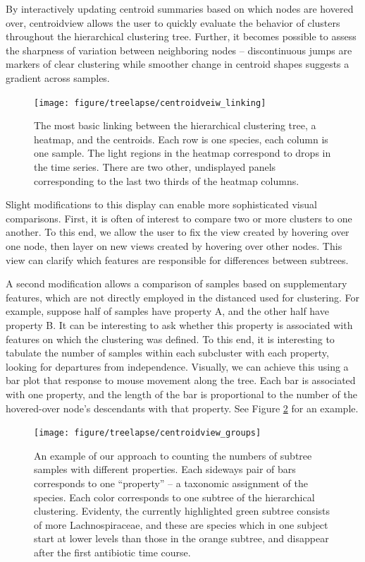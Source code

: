 By interactively updating centroid summaries based on which nodes are hovered
over, centroidview allows the user to quickly evaluate the behavior of clusters
throughout the hierarchical clustering tree. Further, it becomes possible to
assess the sharpness of variation between neighboring nodes -- discontinuous
jumps are markers of clear clustering while smoother change in centroid shapes
suggests a gradient across samples.

\begin{figure}
  \centering
  \texttt{[image: figure/treelapse/centroidveiw\_linking]}
  \caption{
    The most basic linking between the hierarchical clustering tree, a heatmap,
    and the centroids. Each row is one species, each column is one sample. The
    light regions in the heatmap correspond to drops in the time series. There
    are two other, undisplayed panels corresponding to the last two thirds of
    the heatmap columns.
    \label{fig:centroidview_linking}
  }
\end{figure}

Slight modifications to this display can enable more sophisticated visual
comparisons. First, it is often of interest to compare two or more clusters to
one another. To this end, we allow the user to fix the view created by hovering
over one node, then layer on new views created by hovering over other nodes.
This view can clarify which features are responsible for differences between
subtrees.

A second modification allows a comparison of samples based on supplementary
features, which are not directly employed in the distanced used for clustering.
For example, suppose half of samples have property A, and the other half have
property B. It can be interesting to ask whether this property is associated
with features on which the clustering was defined. To this end, it is
interesting to tabulate the number of samples within each subcluster with each
property, looking for departures from independence. Visually, we can achieve
this using a bar plot that response to mouse movement along the tree. Each bar
is associated with one property, and the length of the bar is proportional to
the number of the hovered-over node's descendants with that property. See Figure
\ref{fig:centroidview_groups} for an example.

\begin{figure}
  \centering
  \texttt{[image: figure/treelapse/centroidview\_groups]}
  \caption{
    An example of our approach to counting the numbers of subtree samples with
    different properties. Each sideways pair of bars corresponds to one
    ``property'' -- a taxonomic assignment of the species. Each color
    corresponds to one subtree of the hierarchical clustering. Evidenty, the
    currently highlighted green subtree consists of more Lachnospiraceae, and
    these are species which in one subject start at lower levels than those in
    the orange subtree, and disappear after the first antibiotic time course.
    \label{fig:centroidview_groups}
  }
\end{figure}


